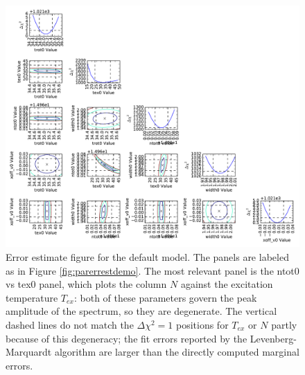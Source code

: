 \documentclass[twocolumn]{aastex62}
\begin{document}
\begin{figure}[!htp]
\includegraphics[scale=1,width=7in]{ammonia_LTE_default_error_estimate_demonstration.pdf}
\caption{Error estimate figure for the default \ammonia model.  The panels
are labeled as in Figure \ref{fig:parerrestdemo}.  The most
relevant panel is the ntot0 vs tex0 panel, which plots the column $N$ against
the excitation temperature $T_{ex}$: both of these parameters govern the peak
amplitude of the spectrum, so they are degenerate.  The vertical dashed lines
do not match the $\Delta\chi^2=1$ positions for $T_{ex}$ or $N$ partly because
of this degeneracy; the fit errors reported by the Levenberg-Marquardt
algorithm are larger than the directly computed marginal errors.}
\label{fig:nh3parerrestdemo}
\end{figure}
\end{document}
